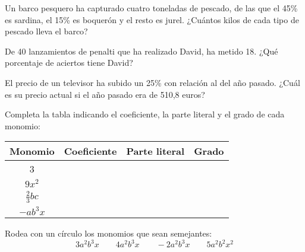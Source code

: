 \documentclass[spanish, 11pt]{exam}
\begin{document}
\begin{questions}
\question[1\half] Un barco pesquero ha capturado cuatro toneladas de pescado, de las que el 45\% es sardina, el 15\% es boquerón y el resto es jurel. ¿Cuántos kilos de cada tipo de pescado lleva el barco?



\question[1] De 40 lanzamientos de penalti que ha realizado David, ha metido 18. ¿Qué porcentaje de aciertos tiene David?



\question[1\half] El precio de un televisor ha subido un 25\% con relación al del año pasado. ¿Cuál es su precio actual si el año pasado era de 510,8 euros?

% 
% 
% 

% 

\question[2]
Completa la tabla indicando el coeficiente, la parte literal y el grado de cada monomio:


\begin{tabular}{|c|c|c|c|}
\hline
\textbf{Monomio} & \textbf{Coeficiente} & \textbf{Parte literal} & \textbf{Grado} \\
\hline
3 & & & \\
\hline
$9x^2$ & & & \\
\hline
$\frac{2}{3}bc$ & & & \\
\hline
$-ab^3x$ & & & \\
\hline
\end{tabular}


\question[1]
Rodea con un círculo los monomios que sean semejantes:
\[
3a^2b^3x \quad\quad 4a^2b^3x \quad\quad -2a^2b^3x \quad\quad 5a^2b^2x^2
\]


\end{questions}
\end{document}

